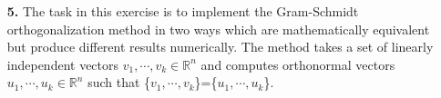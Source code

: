 \documentclass[10pt]{report}
\begin{document}
\begin{enumerate}
%
%
%
%



%
%
%


 \item[\textbf{5.}]
 The task in this exercise is to implement the Gram-Schmidt
  orthogonalization method in two ways which are mathematically equivalent but
  produce different results numerically. The method takes a set of linearly
  independent vectors $v_1,\cdots,v_k\in\mathbb{R}^n$ and computes
  orthonormal vectors $u_1,\cdots,u_k\in\mathbb{R}^n$ such that 
  \{$v_1,\cdots,v_k$\}=\{$u_1,\cdots,u_k$\}. 
  	


\end{enumerate}
\end{document}
